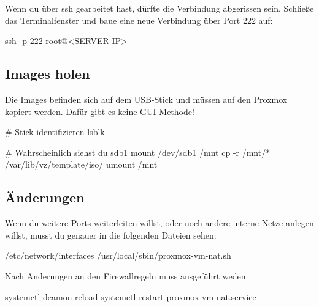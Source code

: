 \documentclass[
  letterpaper,
  DIV=11]{scrreprt}
\newenvironment{Shaded}{\begin{snugshade}}{\end{snugshade}}
\newcommand{\AttributeTok}[1]{\textcolor[rgb]{0.40,0.45,0.13}{#1}}
\newcommand{\CommentTok}[1]{\textcolor[rgb]{0.37,0.37,0.37}{#1}}
\newcommand{\ExtensionTok}[1]{\textcolor[rgb]{0.00,0.23,0.31}{#1}}
\newcommand{\FunctionTok}[1]{\textcolor[rgb]{0.28,0.35,0.67}{#1}}
\newcommand{\NormalTok}[1]{\textcolor[rgb]{0.00,0.23,0.31}{#1}}
\newcommand{\OperatorTok}[1]{\textcolor[rgb]{0.37,0.37,0.37}{#1}}
\newcommand{\PreprocessorTok}[1]{\textcolor[rgb]{0.68,0.00,0.00}{#1}}
\begin{document}
Wenn du über ssh gearbeitet hast, dürfte die Verbindung abgerissen sein.
Schließe das Terminalfenster und baue eine neue Verbindung über Port 222
auf:

\begin{Shaded}
\begin{Highlighting}[]
\FunctionTok{ssh} \AttributeTok{{-}p}\NormalTok{ 222 root@}\OperatorTok{\textless{}}\NormalTok{SERVER{-}IP}\OperatorTok{\textgreater{}}
\end{Highlighting}
\end{Shaded}

\subsection{Images holen}\label{images-holen}

Die Images befinden sich auf dem USB-Stick und müssen auf den Proxmox
kopiert werden. Dafür gibt es keine GUI-Methode!

\begin{Shaded}
\begin{Highlighting}[]
\CommentTok{\# Stick identifizieren}
\ExtensionTok{lsblk}

\CommentTok{\# Wahrscheinlich siehst du sdb1}
\FunctionTok{mount}\NormalTok{ /dev/sdb1 /mnt}
\FunctionTok{cp} \AttributeTok{{-}r}\NormalTok{ /mnt/}\PreprocessorTok{*}\NormalTok{ /var/lib/vz/template/iso/}
\FunctionTok{umount}\NormalTok{ /mnt}
\end{Highlighting}
\end{Shaded}

\subsection{Änderungen}\label{uxe4nderungen}

Wenn du weitere Ports weiterleiten willst, oder noch andere interne
Netze anlegen willst, musst du genauer in die folgenden Dateien sehen:

\begin{Shaded}
\begin{Highlighting}[]
\ExtensionTok{/etc/network/interfaces}
\ExtensionTok{/usr/local/sbin/proxmox{-}vm{-}nat.sh}
\end{Highlighting}
\end{Shaded}

Nach Änderungen an den Firewallregeln muss ausgeführt weden:

\begin{Shaded}
\begin{Highlighting}[]
\ExtensionTok{systemctl}\NormalTok{ deamon{-}reload}
\ExtensionTok{systemctl}\NormalTok{ restart proxmox{-}vm{-}nat.service}
\end{Highlighting}
\end{Shaded}
\end{document}
